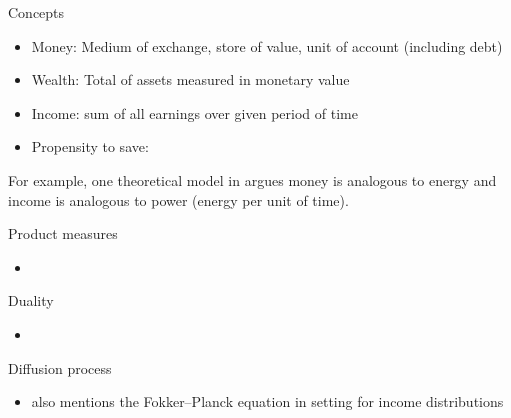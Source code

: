 \documentclass[9pt, handout]{beamer}
\begin{document}
\begin{frame}{Concepts}
\begin{itemize}
    \item Money: Medium of exchange, store of value, unit of account (including debt)
    \item Wealth: Total of assets measured in monetary value
    \item Income: sum of all earnings over given period of time
    \item Propensity to save: 
\end{itemize}
For example, one theoretical model in \cite{yakovenko2009colloquium} argues money is analogous to energy and income is analogous to power (energy per unit of time).
\end{frame}


\begin{frame}{Product measures}
\begin{itemize}
    \item
\end{itemize}
\end{frame}


\begin{frame}{Duality}
\begin{theorem}
\end{theorem}
\begin{itemize}
    \item
\end{itemize}
\end{frame}


\begin{frame}{Diffusion process}
\begin{itemize}
    \item {} also mentions the Fokker--Planck equation in setting for income distributions
\end{itemize}
\end{frame}
\end{document}
